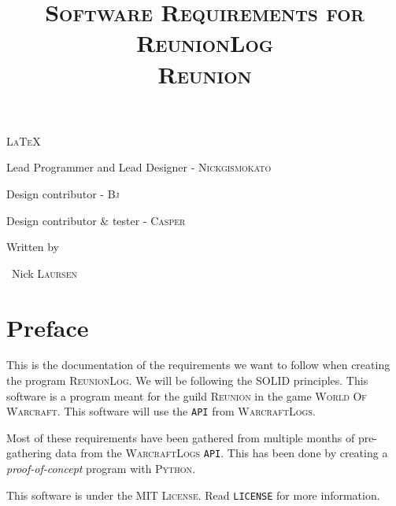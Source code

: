 \documentclass[10pt, a4paper]{memoir}
\numberwithin{equation}{section}
\theoremstyle{plain}
\theoremstyle{defp}
\theoremstyle{dotless}
\theoremstyle{definition}
\theoremstyle{dotless}
\theoremstyle{dotless}
\theoremstyle{defp}
\theoremstyle{defp}
\theoremstyle{be}          %
\theoremstyle{defp}
\newcommand\ttt[1]{\texttt{#1}}
\begin{document}

\newcommand*\mytitle{\textsc{Software Requirements for ReunionLog}}


\title{\mytitle \\[1ex] \large \textsc{Reunion}\\}
\date{}

\centering
\maketitle
	{\scshape\LARGE \LaTeX \par}
	\vspace{0.5cm}
	{Lead Programmer and Lead Designer - \Large\scshape Nickgismokato\par}
	\vspace{0.3cm}
	{Design contributor - \Large\scshape Bj\par}
	\vspace{0.3cm}
	{Design contributor \& tester - \Large\scshape Casper\par}
	\vspace{1cm}
	\vfill
	Written by\par
	~Nick \textsc{Laursen}


\thispagestyle{empty}

\newpage

\section*{\centering Preface}

This is the documentation of the requirements we want to follow when creating the program \textsc{ReunionLog}. We will be following the \textsc{SOLID} principles. This software is a program meant for the guild \textsc{Reunion} in the game \textsc{World Of Warcraft}. This software will use the \ttt{API} from \textsc{WarcraftLogs}. 

\medskip

Most of these requirements have been gathered from multiple months of pre-gathering data from the \textsc{WarcraftLogs} \ttt{API}. This has been done by creating a \textit{proof-of-concept} program with \textsc{Python}.

\medskip

\center

This software is under the \textsc{MIT License}. Read \ttt{LICENSE} for more information.
\end{document}
